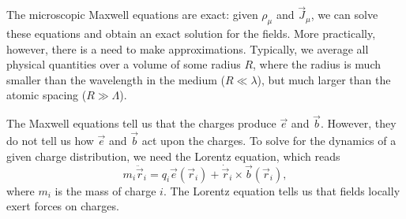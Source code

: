 \documentclass{article}
\begin{document}
The microscopic Maxwell equations are exact: given $\rho_\mu$ and $\vec{J}_\mu$, we can solve these equations and obtain an exact solution for the fields. More practically, however, there is a need to make approximations. Typically, we average all physical quantities over a volume of some radius $R$, where the radius is much smaller than the wavelength in the medium ($R\ll\lambda$), but much larger than the atomic spacing ($R\gg\Lambda$).


The Maxwell equations tell us that the charges produce $\vec e$ and $\vec b$. However, they do not tell us how $\vec e$ and $\vec b$ act upon the charges. To solve for the dynamics of a given charge distribution, we need the Lorentz equation, which reads
\begin{equation}
    m_i \ddot{\vec{r}}_i = q_i \vec e(\vec{r}_i) + \dot{\vec{r}}_i\times\vec b(\vec{r}_i),
\end{equation}
where $m_i$ is the mass of charge $i$. The Lorentz equation tells us that fields locally exert forces on charges.
\end{document}

